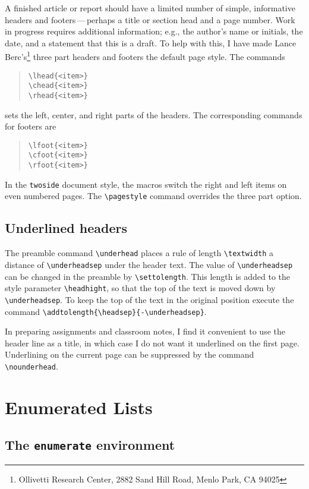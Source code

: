 A finished article or report should have a limited number of simple,
informative headers and footers\,---\,perhaps a title or section head
and a page number.  Work in progress requires additional information;
e.g., the author's name or initials, the date, and a statement that
this is a draft.  To help with this, I have made Lance
Berc's\footnote{Ollivetti Research Center, 2882 Sand Hill Road,
Menlo Park, CA 94025} three part headers and footers the default page
style.  The commands
\begin{quote}
\begin{verbatim}
\lhead{<item>}
\chead{<item>}
\rhead{<item>}
\end{verbatim}
\end{quote}
sets the left, center, and right parts of the headers.  The
corresponding commands for footers are
\begin{quote}
\begin{verbatim}
\lfoot{<item>}
\cfoot{<item>}
\rfoot{<item>}
\end{verbatim}
\end{quote}
In the {\tt twoside} document style, the macros switch the right and
left items on even numbered pages.  The \verb|\pagestyle| command
overrides the three part option.

\subsection{Underlined headers}

The preamble command \verb|\underhead| places a
rule of length \verb|\textwidth| a distance of
\verb|\underheadsep| under the header text.  The value
of \verb|\underheadsep| can be changed in the preamble by
\verb|\settolength|.  This length is added
to the style parameter \verb|\headhight|, so that the top of the text
is moved down by \verb|\underheadsep|.  To keep the top of the text
in the original position execute the command
\verb|\addtolength{\headsep}{-\underheadsep}|.

In preparing assignments and classroom notes, I find it convenient to
use the header line as a title, in which case I do not want it
underlined on the first page.  Underlining on the current page can be
suppressed by the command \verb|\nounderhead|.

\section{Enumerated Lists}

\subsection{The {\tt enumerate} environment}

